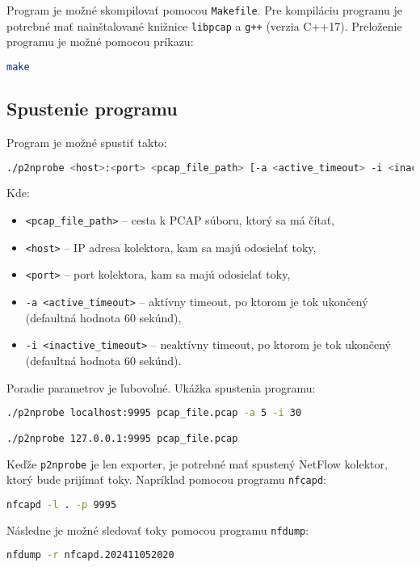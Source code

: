 \documentclass[a4paper, 12pt]{article}
\begin{document}
Program je možné skompilovať pomocou \texttt{Makefile}. Pre kompiláciu programu je potrebné mať nainštalované knižnice \texttt{libpcap} a \texttt{g++} (verzia C++17). Preloženie programu je možné pomocou príkazu:
\begin{lstlisting}[language=bash]
make
\end{lstlisting}

\subsection{Spustenie programu}

Program je možné spustiť takto:
\begin{lstlisting}[language=bash]
./p2nprobe <host>:<port> <pcap_file_path> [-a <active_timeout> -i <inactive_timeout>]
\end{lstlisting}
Kde:
\begin{itemize}
    \item \texttt{<pcap\_file\_path>} -- cesta k PCAP súboru, ktorý sa má čítať,
    \item \texttt{<host>} -- IP adresa kolektora, kam sa majú odosielať toky,
    \item \texttt{<port>} -- port kolektora, kam sa majú odosielať toky,
    \item \texttt{-a <active\_timeout>} -- aktívny timeout, po ktorom je tok ukončený (defaultná hodnota 60 sekúnd),
    \item \texttt{-i <inactive\_timeout>} -- neaktívny timeout, po ktorom je tok ukončený (defaultná hodnota 60 sekúnd).
\end{itemize}
Poradie parametrov je ľubovoľné.
Ukážka spustenia programu:
\begin{lstlisting}[language=bash]
./p2nprobe localhost:9995 pcap_file.pcap -a 5 -i 30

./p2nprobe 127.0.0.1:9995 pcap_file.pcap
\end{lstlisting}

Keďže \texttt{p2nprobe} je len exporter, je potrebné mať spustený NetFlow kolektor, ktorý bude prijímať toky. Napríklad pomocou programu \texttt{nfcapd}:
\begin{lstlisting}[language=bash]
nfcapd -l . -p 9995
\end{lstlisting}

Následne je možné sledovať toky pomocou programu \texttt{nfdump}:
\begin{lstlisting}[language=bash]
nfdump -r nfcapd.202411052020
\end{lstlisting}
\end{document}
